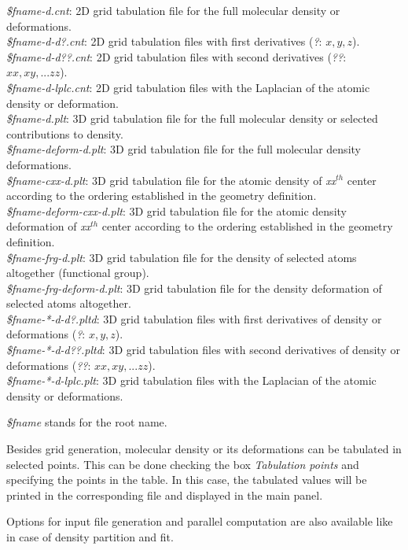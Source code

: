 \documentclass[10pt]{article}
\begin{document}
{\it \$fname-d.cnt}: 2D grid tabulation file for the full molecular density or
deformations. \\
{\it \$fname-d-d?.cnt}: 2D grid tabulation files with first derivatives
({\it ?}: $x, y, z$). \\
{\it \$fname-d-d??.cnt}: 2D grid tabulation files with second derivatives 
({\it ??}: $xx, xy, ... zz$). \\
{\it \$fname-d-lplc.cnt}: 2D grid tabulation files with the Laplacian of the
atomic density or deformation. \\
{\it \$fname-d.plt}: 3D grid tabulation file for the full molecular density or selected contributions to density. \\
{\it \$fname-deform-d.plt}: 3D grid tabulation file for the full molecular density deformations. \\
{\it \$fname-cxx-d.plt}: 3D grid tabulation file for the atomic density of {\it xx$^{th}$} center according to the ordering established in
the geometry definition. \\
{\it \$fname-deform-cxx-d.plt}: 3D grid tabulation file for the atomic density
deformation of {\it xx$^{th}$} center according to the ordering established in
the geometry definition. \\
{\it \$fname-frg-d.plt}: 3D grid tabulation file for the density of selected atoms altogether
(functional
group).\\
{\it \$fname-frg-deform-d.plt}: 3D grid tabulation file for the density deformation of selected atoms altogether.\\
{\it \$fname-*-d-d?.pltd}:  3D grid tabulation files with first derivatives of density or deformations
({\it ?}: $x, y, z$). \\
{\it \$fname-*-d-d??.pltd}:  3D grid tabulation files with second derivatives of density or deformations
({\it ??}: $xx, xy, ... zz$). \\
{\it \$fname-*-d-lplc.plt}:  3D grid tabulation files with the Laplacian of the
atomic density or deformations.

{\it \$fname} stands for the root name.

Besides grid generation, molecular density or its deformations can be
tabulated in selected points. This can be done checking the box {\it Tabulation
points} and specifying the points in the table. In this case, the
tabulated values will be printed in the corresponding \out{ } file and displayed
in the main panel.

Options for input file generation and parallel computation are also available like in 
case of density partition and fit.
\end{document}
